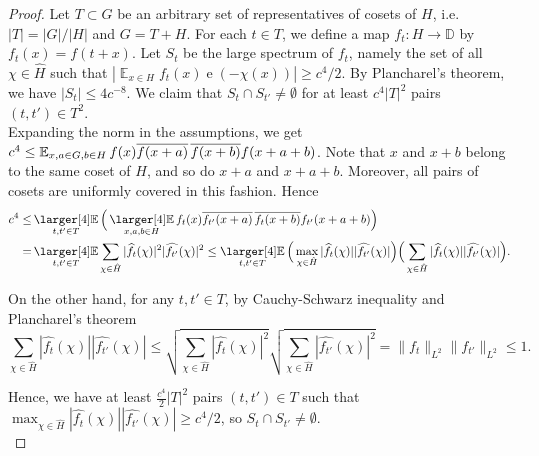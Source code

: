 \documentclass[a4paper,11pt]{article}
\numberwithin{theorem}{section}
\theoremstyle{definition}
\newcommand{\on}[1]{
	\operatorname{#1}
}
\newcommand\ex{\mathop{\mathbb{E}}}
\newcommand{\exx}{
  \mathop{
    \mathchoice{\vcenter{\hbox{\larger[4]$\mathbb{E}$}}}
               {\kern0pt\mathbb{E}}
               {\kern0pt\mathbb{E}}
               {\kern0pt\mathbb{E}}
  }\displaylimits
}
\begin{document}
\begin{proof}
    Let $T \subset G$ be an arbitrary set of representatives of cosets of $H$, i.e. $|T| = |G| / |H|$ and $G = T + H$. For each $t \in T$, we define a map $f_t : H \to \mathbb{D}$ by $f_t(x) = f(t + x)$. Let $S_t$ be the large spectrum of $f_{t}$, namely the set of all $\chi \in \hat{H}$ such that $|\ex_{x \in H} f_t(x) \on{e}(-\chi(x))| \geq c^4/2$. By Plancharel's theorem, we have $|S_t| \leq 4 c^{-8}$. We claim that $S_t \cap S_{t'} \not= \emptyset$ for at least $c^4 |T|^2$ pairs $(t, t') \in T^2$.\\

    Expanding the norm in the assumptions, we get $c^4 \leq \exx_{x, a \in G, b \in H} f(x) \overline{f(x + a)}\,\overline{f(x + b)} f(x + a + b)$. Note that $x$ and $x + b$ belong to the same coset of $H$, and so do $x + a$ and $x + a + b$. Moreover, all pairs of cosets are uniformly covered in this fashion. Hence 
    \begin{align*}c^4 \leq &\exx_{t, t' \in T} \Big(\exx_{x ,a,b \in H} f_{t}(x) \overline{ f_{t'}(x + a) }\,\overline{ f_{t}(x + b) }  f_{t'}(x + a  +b)\Big)\\
    = &\exx_{t, t' \in T} \sum_{\chi \in \hat{H}} |\widehat{f_t}(\chi)|^2 |\widehat{f_{t'}}(\chi)|^2 \leq \exx_{t, t' \in T} \Big(\max_{\chi \in \hat{H}} |\widehat{f_t}(\chi)||\widehat{f_{t'}}(\chi)|\Big)\Big(\sum_{\chi \in \hat{H}} |\widehat{f_t}(\chi)| |\widehat{f_{t'}}(\chi)|\Big).\end{align*}

    On the other hand, for any $t, t' \in T$, by Cauchy-Schwarz inequality and Plancharel's theorem
    \[\sum_{\chi \in \hat{H}} |\widehat{f_t}(\chi)| |\widehat{f_{t'}}(\chi)| \leq \sqrt{\sum_{\chi \in \hat{H}} |\widehat{f_t}(\chi)|^2}\sqrt{\sum_{\chi \in \hat{H}} |\widehat{f_{t'}}(\chi)|^2} = \|f_t\|_{L^2}\|f_{t'}\|_{L^2} \leq 1.\]

    Hence, we have at least $\frac{c^4}{2}|T|^2$ pairs $(t,t') \in T$ such that $\max_{\chi \in \hat{H}} |\widehat{f_t}(\chi)||\widehat{f_{t'}}(\chi)| \geq c^4/2$, so $S_{t} \cap S_{t'} \not= \emptyset$.\\ 
    

\end{proof}
\end{document}
